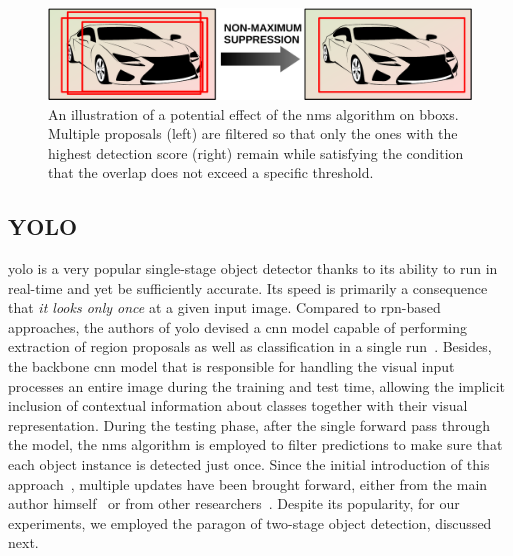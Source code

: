 \begin{figure}[t]
    \centerline{\includegraphics[width=0.6\linewidth]{figures/theoretical_foundations/non_maximum_suppression.pdf}}
    \caption[\Gls{nms} visualization]{An illustration of a potential effect of the \gls{nms} algorithm on \glspl{bbox}. Multiple proposals (left) are filtered so that only the ones with the highest detection score (right) remain while satisfying the condition that the overlap does not exceed a specific threshold.}
    \label{fig:NonMaximumSuppression}
\end{figure}

\subsection{YOLO}
\label{ssec:YouLookOnlyOnce}

\Gls{yolo} is a very popular single-stage object detector thanks to its ability to run in real-time and yet be sufficiently accurate. Its speed is primarily a consequence that \emph{it looks only once} at a given input image. Compared to \gls{rpn}-based approaches, the authors of \gls{yolo} devised a \gls{cnn} model capable of performing extraction of region proposals as well as classification in a single run~\cite{redmon2016yolo}. Besides, the backbone \gls{cnn} model that is responsible for handling the visual input processes an entire image during the training and test time, allowing the implicit inclusion of contextual information about classes together with their visual representation. During the testing phase, after the single forward pass through the model, the \gls{nms} algorithm is employed to filter predictions to make sure that each object instance is detected just once. Since the initial introduction of this approach~\cite{redmon2016yolo}, multiple updates have been brought forward, either from the main author himself~\cite{redmon2017yolo9000, redmon2018yolov3} or from other researchers~\cite{wang2020yolov4, wong2019yolonano}. Despite its popularity, for our experiments, we employed the paragon of two-stage object detection, discussed next.

